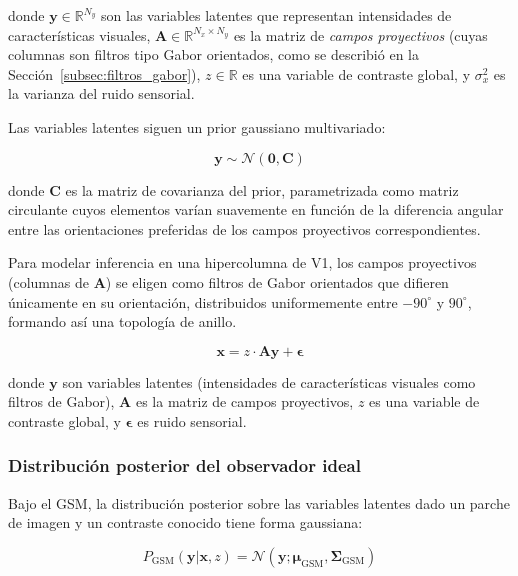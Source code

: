 donde $\mathbf{y} \in \mathbb{R}^{N_y}$ son las variables latentes que representan intensidades de características visuales, $\mathbf{A} \in \mathbb{R}^{N_x \times N_y}$ es la matriz de \textit{campos proyectivos} (cuyas columnas son filtros tipo Gabor orientados, como se describió en la Sección~\ref{subsec:filtros_gabor}), $z \in \mathbb{R}$ es una variable de contraste global, y $\sigma_x^2$ es la varianza del ruido sensorial.

Las variables latentes siguen un prior gaussiano multivariado:

\begin{equation}
\mathbf{y} \sim \mathcal{N}(\mathbf{0}, \mathbf{C})
\label{eq:gsm_prior}
\end{equation}

donde $\mathbf{C}$ es la matriz de covarianza del prior, parametrizada como matriz circulante cuyos elementos varían suavemente en función de la diferencia angular entre las orientaciones preferidas de los campos proyectivos correspondientes.

Para modelar inferencia en una hipercolumna de V1, los campos proyectivos (columnas de $\mathbf{A}$) se eligen como filtros de Gabor orientados que difieren únicamente en su orientación, distribuidos uniformemente entre $-90^\circ$ y $90^\circ$, formando así una topología de anillo.

\begin{equation}
\mathbf{x} = z \cdot \mathbf{A}\mathbf{y} + \boldsymbol{\epsilon}
\label{eq:gsm}
\end{equation}

donde $\mathbf{y}$ son variables latentes (intensidades de características visuales como filtros de Gabor), $\mathbf{A}$ es la matriz de campos proyectivos, $z$ es una variable de contraste global, y $\boldsymbol{\epsilon}$ es ruido sensorial.

\subsubsection{Distribución posterior del observador ideal}

Bajo el \acrshort{GSM}, la distribución posterior sobre las variables latentes dado un parche de imagen y un contraste conocido tiene forma gaussiana:

\begin{equation}
P_{\text{GSM}}(\mathbf{y}|\mathbf{x}, z) = \mathcal{N}(\mathbf{y}; \boldsymbol{\mu}_{\text{GSM}}, \boldsymbol{\Sigma}_{\text{GSM}})
\label{eq:gsm_posterior}
\end{equation}

